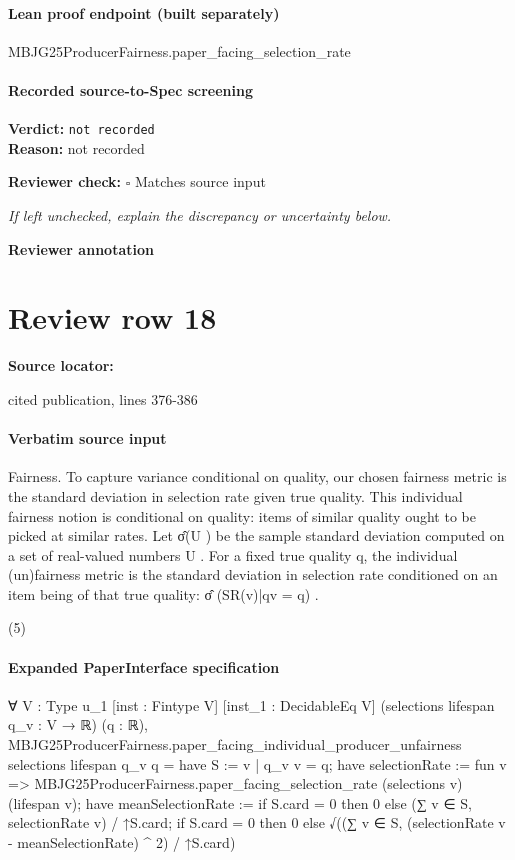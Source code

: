 \documentclass[10pt]{article}
\newcommand{\reviewerbox}{%
  \par\noindent\fbox{\parbox{0.96\linewidth}{\rule{0pt}{0.38in}}}\par
}
\newcommand{\reviewmatch}[1]{%
  \par\noindent\textbf{Reviewer check:} $\square$\; #1\par
  \noindent\emph{If left unchecked, explain the discrepancy or uncertainty below.}\par
}
\begin{document}
\paragraph{Lean proof endpoint (built separately)}\begin{ReviewVerbatim}
MBJG25ProducerFairness.paper_facing_selection_rate
\end{ReviewVerbatim}

\paragraph{Recorded source-to-Spec screening}
\textbf{Verdict:} \texttt{not recorded}
\\
\textbf{Reason:} not recorded
\reviewmatch{Matches source input}
\noindent\textbf{Reviewer annotation}\par
\reviewerbox
\clearpage
\hypertarget{source-claim-430cb3de083df7cf}{}
\section*{Review row 18}
\textbf{Source locator:} {\footnotesize\raggedright cited publication, lines 376-\allowbreak{}386\par}
\paragraph{Verbatim source input}
\begin{ReviewVerbatim}
Fairness. To capture variance conditional on quality, our
chosen fairness metric is the standard deviation in selection rate given true quality. This individual fairness notion
is conditional on quality: items of similar quality ought to
be picked at similar rates. Let σ̂(U ) be the sample standard
deviation computed on a set of real-valued numbers U . For a
fixed true quality q, the individual (un)fairness metric is the
standard deviation in selection rate conditioned on an item
being of that true quality:
σ̂ ({SR(v)|qv = q}) .

(5)
\end{ReviewVerbatim}


\paragraph{Expanded PaperInterface specification}
\begin{ReviewVerbatim}
∀ {V : Type u_1} [inst : Fintype V] [inst_1 : DecidableEq V] (selections lifespan q_v : V → ℝ) (q : ℝ),
  MBJG25ProducerFairness.paper_facing_individual_producer_unfairness selections lifespan q_v q =
    have S := {v | q_v v = q};
    have selectionRate := fun v => MBJG25ProducerFairness.paper_facing_selection_rate (selections v) (lifespan v);
    have meanSelectionRate := if S.card = 0 then 0 else (∑ v ∈ S, selectionRate v) / ↑S.card;
    if S.card = 0 then 0 else √((∑ v ∈ S, (selectionRate v - meanSelectionRate) ^ 2) / ↑S.card)
\end{ReviewVerbatim}
\end{document}
